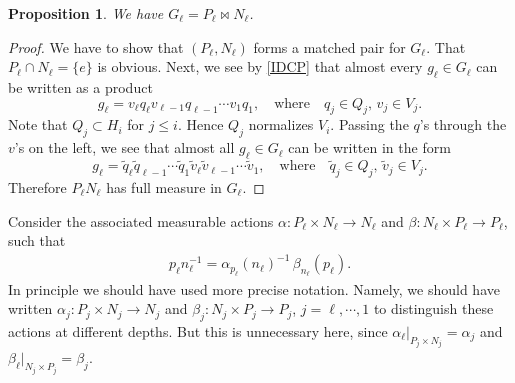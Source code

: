 \documentclass[a4paper,11pt,reqno]{amsart}
\numberwithin{equation}{section}
\newtheorem{proposition}[theorem]{Proposition}
\theoremstyle{remark}
\theoremstyle{definition}
\begin{document}
\begin{proposition}
We have $G_\ell=P_\ell\bowtie N_\ell$.
\end{proposition}
\begin{proof}
We have to show that  $(P_\ell,N_\ell)$ forms a matched pair for $G_\ell$.
That $P_\ell\cap N_\ell=\{e\}$ is obvious. Next, we see by \eqref{IDCP} that almost every  $g_\ell\in G_\ell$ can be written as a product
\begin{equation}
\label{P1}
g_\ell=v_\ell q_\ell v_{\ell-1} q_{\ell-1}\cdots v_1q_1,\quad \mbox{where}\quad q_j\in Q_j,\, v_j\in V_j.
\end{equation}
Note that $Q_j\subset H_i$ for $j\leq i$. Hence $Q_j$ normalizes $V_i$. Passing the $q$'s through the $v$'s on the left, we see
that  almost all $g_\ell\in G_\ell$ can be written in the form
$$
g_\ell=\tilde q_\ell \tilde q_{\ell-1}\cdots \tilde q_1 \tilde v_\ell \tilde v_{\ell-1}\cdots \tilde  v_1 ,\quad \mbox{where}\quad \tilde  q_j\in Q_j,\, \tilde  v_j\in V_j .
$$
Therefore $P_\ell N_\ell$ has full measure in $G_\ell$.
\end{proof}

Consider the associated  measurable actions $\alpha \colon P_\ell\times N_\ell\to N_\ell$ and
$\beta:N_\ell\times P_\ell\to P_\ell$, such that
\begin{align}
\label{MA}
p_\ell n_\ell^{-1}=\alpha _{p_\ell}(n_\ell)^{-1}\,\beta_{n_\ell}(p_\ell).
\end{align}
In principle we should have used more precise notation. Namely, we should have written
$\alpha_j \colon P_j\times N_j\to N_j$ and
$\beta_j\colon  N_j\times P_j\to P_j$, $j=\ell,\cdots,1$  to distinguish these actions  at different depths.
But this is unnecessary  here,  since $\alpha_\ell|_{P_j\times N_j}=\alpha_j$ and $\beta_\ell|_{N_j\times P_j}=\beta_j$.
\end{document}
